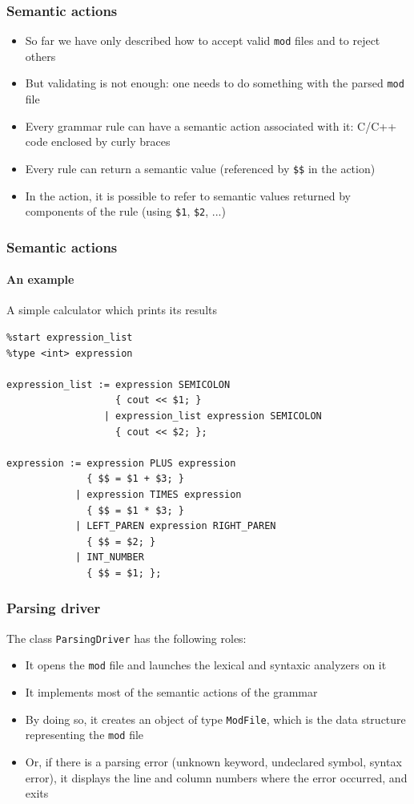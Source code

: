 \documentclass{beamer}
\begin{document}
\begin{frame}
\frametitle{Semantic actions}
\begin{itemize}
\item So far we have only described how to accept valid \texttt{mod} files and to reject others
\item But validating is not enough: one needs to do something with the parsed \texttt{mod} file
\item Every grammar rule can have a \alert{semantic action} associated with it: C/C++ code enclosed by curly braces
\item Every rule can return a semantic value (referenced by \texttt{\$\$} in the action)
\item In the action, it is possible to refer to semantic values returned by components of the rule (using \texttt{\$1}, \texttt{\$2}, ...)
\end{itemize}
\end{frame}

\begin{frame}[fragile]
\frametitle{Semantic actions}
\framesubtitle{An example}
\begin{block}{A simple calculator which prints its results}
\begin{footnotesize}
\begin{verbatim}
%start expression_list
%type <int> expression

expression_list := expression SEMICOLON
                   { cout << $1; }
                 | expression_list expression SEMICOLON
                   { cout << $2; };

expression := expression PLUS expression
              { $$ = $1 + $3; }
            | expression TIMES expression
              { $$ = $1 * $3; }
            | LEFT_PAREN expression RIGHT_PAREN
              { $$ = $2; }
            | INT_NUMBER
              { $$ = $1; };
\end{verbatim}
\end{footnotesize}
\end{block}
\end{frame}

\begin{frame}
\frametitle{Parsing driver}

The class \texttt{ParsingDriver} has the following roles:
\begin{itemize}
\item It opens the \texttt{mod} file and launches the lexical and syntaxic analyzers on it
\item It implements most of the semantic actions of the grammar
\item By doing so, it creates an object of type \texttt{ModFile}, which is the data structure representing the \texttt{mod} file
\item Or, if there is a parsing error (unknown keyword, undeclared symbol, syntax error), it displays the line and column numbers where the error occurred, and exits
\end{itemize}
\end{frame}
\end{document}
